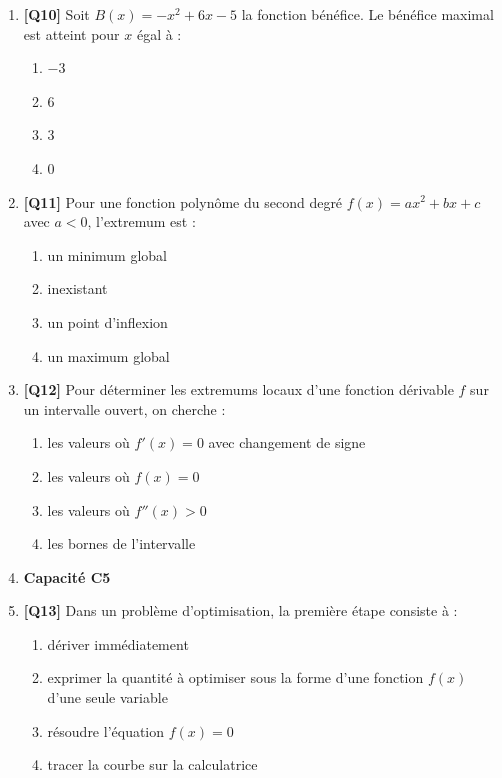 \begin{enumerate}
\item \textbf{[Q10]} Soit $B(x) = -x^2 + 6x - 5$ la fonction bénéfice. Le bénéfice maximal est atteint pour $x$ égal à :
  \begin{enumerate}[label=\Alph*.]
    \item $-3$
    \item $6$
    \item $3$
    \item $0$
  \end{enumerate}

\item \textbf{[Q11]} Pour une fonction polynôme du second degré $f(x) = ax^2 + bx + c$ avec $a < 0$, l'extremum est :
  \begin{enumerate}[label=\Alph*.]
    \item un minimum global
    \item inexistant
    \item un point d'inflexion
    \item un maximum global
  \end{enumerate}

\item \textbf{[Q12]} Pour déterminer les extremums locaux d'une fonction dérivable $f$ sur un intervalle ouvert, on cherche :
  \begin{enumerate}[label=\Alph*.]
    \item les valeurs où $f'(x) = 0$ avec changement de signe
    \item les valeurs où $f(x) = 0$
    \item les valeurs où $f''(x) > 0$
    \item les bornes de l'intervalle
  \end{enumerate}

\item[] \textbf{Capacité C5}

\item \textbf{[Q13]} Dans un problème d'optimisation, la première étape consiste à :
  \begin{enumerate}[label=\Alph*.]
    \item dériver immédiatement
    \item exprimer la quantité à optimiser sous la forme d'une fonction $f(x)$ d'une seule variable
    \item résoudre l'équation $f(x) = 0$
    \item tracer la courbe sur la calculatrice
  \end{enumerate}


\end{enumerate}
